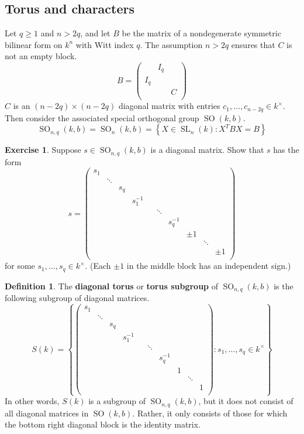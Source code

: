 \documentclass[12pt]{article}
\theoremstyle{definition}
\newtheorem{definition}[theorem]{Definition}
\newtheorem{exercise}[theorem]{Exercise}
\newcommand{\lb}{\left\{}
\newcommand{\rb}{\right\}}
\newcommand{\tbf}{\textbf}
\newcommand{\noi}{\noindent}
\newcommand{\inv}{^{-1}}
\DeclareMathOperator{\SL}{SL}
\DeclareMathOperator{\SO}{SO}
\begin{document}
\subsection{Torus and characters}

\noi Let $q \ge 1$ and $n > 2q$, and let $B$ be the matrix of a nondegenerate symmetric bilinear form on $k^n$ with Witt index $q$. The assumption $n > 2q$ ensures that $C$ is not an empty block.
\[
	B = 
	\begin{pmatrix}
		& I_q \\
		I_q \\
		&& C  \\
	\end{pmatrix}
\]
$C$ is an $(n-2q) \times (n-2q)$ diagonal matrix with entries $c_1, \ldots, c_{n-2q} \in k^\times$. Then consider the associated special orthogonal group $\SO(k,b)$.
\[
	\SO_{n,q}(k,b) = \SO_n(k,b) = \lb X \in \SL_n(k) : X^T BX = B \rb
\]

\begin{exercise}
Suppose $s \in \SO_{n,q}(k,b)$ is a diagonal matrix. Show that $s$ has the form
\[
	s =
	\begin{pmatrix}
		s_1 \\
		& \ddots \\
		&& s_q \\
		&&& s_1 \inv \\
		&&&&& \ddots \\
		&&&&&& s_q \inv \\
		&&&&&&& \pm 1 \\
		&&&&&&&& \ddots \\
		&&&&&&&&& \pm 1 \\
	\end{pmatrix}
\]
for some $s_1, \ldots, s_q \in k^\times$. (Each $\pm 1$ in the middle block has an independent sign.)
\end{exercise}

\begin{definition}
The \tbf{diagonal torus} or \tbf{torus subgroup} of $\SO_{n,q}(k,b)$ is the following subgroup of diagonal matrices.
\[
	S(k) = \lb
	\begin{pmatrix}
		s_1 \\
		& \ddots \\
		&& s_q \\
		&&& s_1 \inv \\
		&&&&& \ddots \\
		&&&&&& s_q \inv \\
		&&&&&&& 1 \\
		&&&&&&&& \ddots \\
		&&&&&&&&& 1 \\
	\end{pmatrix}
	: s_1, \ldots, s_q \in k^\times \rb
\]
In other words, $S(k)$ is a subgroup of $\SO_{n,q}(k,b)$, but it does not consist of all diagonal matrices in $\SO(k,b)$. Rather, it only consists of those for which the bottom right diagonal block is the identity matrix.
\end{definition}
\end{document}
